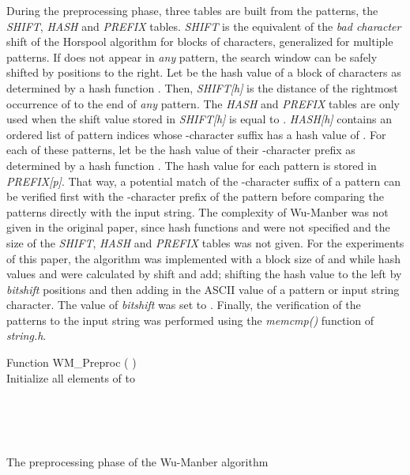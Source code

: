 \documentclass{ws-ijait}
\begin{document}
During the preprocessing phase, three tables are built from the patterns, the \textit{SHIFT}, \textit{HASH} and \textit{PREFIX} tables. \textit{SHIFT} is the equivalent of the \textit{bad character} shift of the Horspool algorithm for blocks of characters, generalized for multiple patterns. If  does not appear in \textit{any} pattern, the search window can be safely shifted by  positions to the right. Let  be the hash value of a block of  characters as determined by a hash function . Then, \textit{SHIFT[h]} is the distance of the rightmost occurrence of  to the end of \textit{any} pattern. The \textit{HASH} and \textit{PREFIX} tables are only used when the shift value stored in \textit{SHIFT[h]} is equal to . \textit{HASH[h]} contains an ordered list of pattern indices whose -character suffix has a hash value of . For each of these patterns, let  be the hash value of their -character prefix as determined by a hash function . The hash value  for each pattern  is stored in \textit{PREFIX[p]}. That way, a potential match of the -character suffix of a pattern can be verified first with the -character prefix of the pattern before comparing the patterns directly with the input string. The complexity of Wu-Manber was not given in the original paper, since hash functions  and  were not specified and the size of the \textit{SHIFT}, \textit{HASH} and \textit{PREFIX} tables was not given.\cite{Navarro2002} For the experiments of this paper, the algorithm was implemented with a block size of  and  while hash values  and  were calculated by shift and add; shifting the hash value to the left by \textit{bitshift} positions and then adding in the ASCII value of a pattern or input string character. The value of \textit{bitshift} was set to . Finally, the verification of the patterns to the input string was performed using the \textit{memcmp()} function of \textit{string.h}.

\begin{algorithm}[h]

Function WM\_Preproc (  )\\

Initialize all elements of  to \\

\For{ } {

	\For{ } {
		
		\\
		
		\\
			
		\\
			
		\If{  }{
			
			\\
			
			\\
			
			\\
		}
	}
}

\caption{The preprocessing phase of the Wu-Manber algorithm}
\label{compl:wu_manber_preproc}
\end{algorithm}
\end{document}
